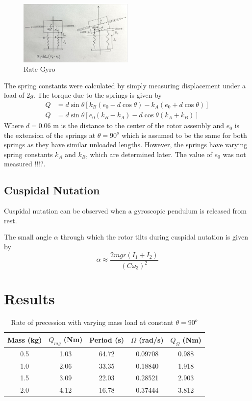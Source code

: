 \documentclass[8pt]{article}
\begin{document}
\begin{figure}
    \centering
    \includegraphics[width=0.5\textwidth]{rate_gyro.jpg}
    \caption{Rate Gyro}
    \label{fig:rate_gyro}
\end{figure}

The spring constants were calculated by simply measuring displacement under a load of $2g$.
The torque due to the springs is given by
\begin{align}
    Q &= d \sin \theta \left[ k_B (e_0 - d \cos \theta) - k_A (e_0 + d \cos \theta) \right] \\
    Q &= d \sin \theta \left[ e_0 (k_B - k_A) - d \cos \theta (k_A + k_B) \right]
\end{align}
Where $d = 0.06$ m is the distance to the center of the rotor assembly and $e_0$ is the extension of the springs at $\theta = 90^o$ which is assumed to be the same for both springs as they have similar unloaded lengths.
However, the springs have varying spring constants $k_A$ and $k_B$, which are determined later.
The value of $e_0$ was not measured !!!?.

\subsection{Cuspidal Nutation}

Cuspidal nutation can be observed when a gyroscopic pendulum is released from rest.

The small angle $\alpha$ through which the rotor tilts during cuspidal nutation is
given by
\begin{equation}
    \alpha \approx \frac{2mgr(I_1+I_2)}{(C\omega_3)^2} \tag{A8}
\end{equation}


\section{Results}

\begin{table}[H]
    \centering
    \begin{tabular}{|c|c|c|c|c|}
        \hline
        Mass (kg) & $Q_{mg}$ (Nm) & Period (s) & $\Omega$ (rad/s) & $Q_{\Omega} $ (Nm) \\
        \hline
        0.5 & 1.03 & 64.72 & 0.09708 & 0.988\\
        1.0 & 2.06 & 33.35 & 0.18840 & 1.918\\
        1.5 & 3.09 & 22.03 & 0.28521 & 2.903\\
        2.0 & 4.12 & 16.78 & 0.37444 & 3.812\\
        \hline
    \end{tabular}
    \caption{Rate of precession with varying mass load at constant $\theta = 90^o$}
    \label{tab:precession_vs_mass}
\end{table}
\end{document}
